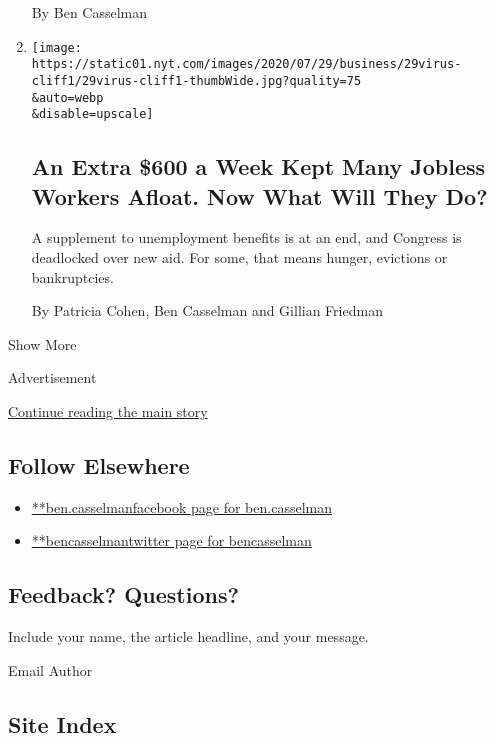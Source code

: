 \begin{enumerate}
  By Ben Casselman
\item
  \href{/2020/07/29/business/economy/unemployment-benefits-coronavirus.html}{}

  \texttt{[image: https://static01.nyt.com/images/2020/07/29/business/29virus-cliff1/29virus-cliff1-thumbWide.jpg?quality=75\\\&auto=webp\\\&disable=upscale]}

  \hypertarget{an-extra-600-a-week-kept-many-jobless-workers-afloat-now-what-will-they-do}{%
  \subsection{An Extra \$600 a Week Kept Many Jobless Workers Afloat.
  Now What Will They
  Do?}\label{an-extra-600-a-week-kept-many-jobless-workers-afloat-now-what-will-they-do}}

  A supplement to unemployment benefits is at an end, and Congress is
  deadlocked over new aid. For some, that means hunger, evictions or
  bankruptcies.

  By Patricia Cohen, Ben Casselman and Gillian Friedman
\end{enumerate}

Show More

Advertisement

\protect\hyperlink{after-mid2}{Continue reading the main story}

\hypertarget{follow-elsewhere}{%
\subsection{Follow Elsewhere}\label{follow-elsewhere}}

\begin{itemize}
\tightlist
\item
  \href{https://www.facebook.com/ben.casselman}{**ben.casselmanfacebook
  page for ben.casselman}
\item
  \href{https://twitter.com/bencasselman}{**bencasselmantwitter page for
  bencasselman}
\end{itemize}

\hypertarget{feedback-questions}{%
\subsection{Feedback? Questions?}\label{feedback-questions}}

Include your name, the article headline, and your message.

Email Author

\hypertarget{site-index}{%
\subsection{Site Index}\label{site-index}}

